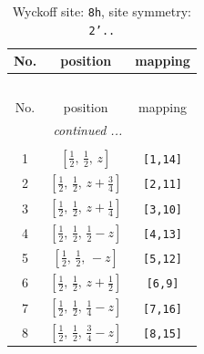 \documentclass[fleqn,8pt]{jsarticle}
\begin{document}
\begin{longtable}{ccc}
\caption{Wyckoff site: {\tt 8h}, site symmetry: {\tt 2'..}}
 \\
 \hline \hline
No. & position & mapping \\ \hline \endfirsthead

\multicolumn{2}{l}{\tablename\ \thetable{}} \\
 \hline \hline
No. & position & mapping \\ \hline \endhead

 \hline \hline
\multicolumn{2}{r}{\footnotesize\it continued ...} \\ \endfoot

 \hline \hline
\multicolumn{2}{r}{} \\ \endlastfoot

1 & $\left[ \frac{1}{2},\, \frac{1}{2},\, z \right]$ & {\tt [1,14]} \\ \hline
2 & $\left[ \frac{1}{2},\, \frac{1}{2},\, z + \frac{3}{4} \right]$ & {\tt [2,11]} \\ \hline
3 & $\left[ \frac{1}{2},\, \frac{1}{2},\, z + \frac{1}{4} \right]$ & {\tt [3,10]} \\ \hline
4 & $\left[ \frac{1}{2},\, \frac{1}{2},\, \frac{1}{2} - z \right]$ & {\tt [4,13]} \\ \hline
5 & $\left[ \frac{1}{2},\, \frac{1}{2},\, - z \right]$ & {\tt [5,12]} \\ \hline
6 & $\left[ \frac{1}{2},\, \frac{1}{2},\, z + \frac{1}{2} \right]$ & {\tt [6,9]} \\ \hline
7 & $\left[ \frac{1}{2},\, \frac{1}{2},\, \frac{1}{4} - z \right]$ & {\tt [7,16]} \\ \hline
8 & $\left[ \frac{1}{2},\, \frac{1}{2},\, \frac{3}{4} - z \right]$ & {\tt [8,15]} \\
\end{longtable}
\renewcommand{\arraystretch}{1.2}
\end{document}
